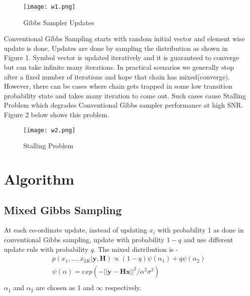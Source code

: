 \documentclass{article}
\begin{document}
\begin{figure}[H]
\centering
\texttt{[image: w1.png]}
\caption{Gibbs Sampler Updates}
\label{fig1:Gibbs Sampler}
\end{figure}

Conventional Gibbs Sampling starts with random initial vector and element wise 
update is done. Updates are done by sampling the distribution as shown in Figure 1.
Symbol vector is updated iteratively and it is guaranteed to converge but can take
infinite many iterations. In practical scenarios we generally stop after a fixed
number of iterations and hope that chain has mixed(converge). However, there can
be cases where chain gets trapped in some low transition probability state and
takes many iteration to come out. Such cases cause Stalling Problem which degrades
Conventional Gibbs sampler performance at high SNR. Figure 2 below shows this problem.

\begin{figure}[H]
\centering
\texttt{[image: w2.png]}
\caption{Stalling Problem}
\label{fig2:Stalling Problem}
\end{figure}

\section*{Algorithm}
\subsection*{Mixed Gibbs Sampling}
At each co-ordinate update, instead of updating $x_i$ with probability 1 
as done in conventional Gibbs sampling, update with probability $1-q$ and
use different update rule with probability $q$. The mixed distribution is -
\begin{equation*}
\begin{split}
    &p(x_1,...,x_{2K}|\mathbf{y},\mathbf{H}) \propto (1-q)\psi(\alpha_1) + q\psi(\alpha_2)\\
    &\psi(\alpha) = exp({ -||\mathbf{y - Hx}|| }^2/\alpha^2\sigma^2)\\
\end{split}
\end{equation*}
$\alpha_1$ and $\alpha_2$ are chosen as 1 and $\infty$ respectively.

\begin{figure}[h]
\centering
{}~
%
\caption{}
\end{figure}
\end{document}
